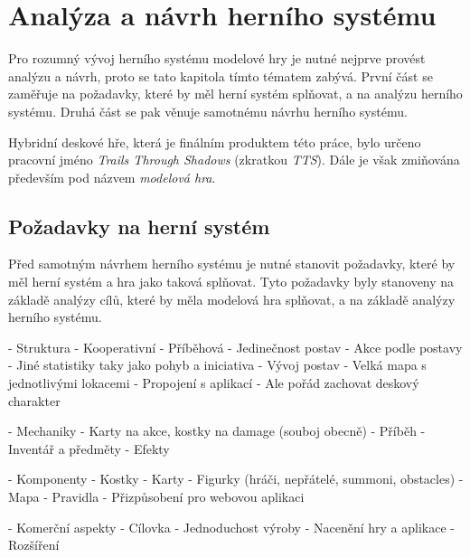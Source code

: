 \chapter{Analýza a návrh herního systému}
\label{chap:design_analysis}

Pro rozumný vývoj herního systému modelové hry je nutné nejprve provést analýzu a návrh, proto se tato kapitola tímto tématem zabývá. První část se zaměřuje na požadavky, které by měl herní systém splňovat, a na analýzu herního systému. Druhá část se pak věnuje samotnému návrhu herního systému.

Hybridní deskové hře, která je finálním produktem této práce, bylo určeno pracovní jméno \textit{Trails Through Shadows} (zkratkou \textit{TTS}). Dále je však zmiňována především pod názvem \textit{modelová hra}.

\section{Požadavky na herní systém}
\label{sec:requirements}

Před samotným návrhem herního systému je nutné stanovit požadavky, které by měl herní systém a hra jako taková splňovat. Tyto požadavky byly stanoveny na základě analýzy cílů, které by měla modelová hra splňovat, a na základě analýzy herního systému.

- Struktura
    - Kooperativní
    - Příběhová
    - Jedinečnost postav
        - Akce podle postavy
        - Jiné statistiky taky jako pohyb a iniciativa
        - Vývoj postav
    - Velká mapa s jednotlivými lokacemi
    - Propojení s aplikací
        - Ale pořád zachovat deskový charakter

- Mechaniky
    - Karty na akce, kostky na damage (souboj obecně)
    - Příběh
    - Inventář a předměty
    - Efekty

- Komponenty
    - Kostky
    - Karty
    - Figurky (hráči, nepřátelé, summoni, obstacles)
    - Mapa
    - Pravidla
    - Přizpůsobení pro webovou aplikaci

- Komerční aspekty
    - Cílovka
    - Jednoduchost výroby
    - Nacenění hry a aplikace
    - Rozšíření